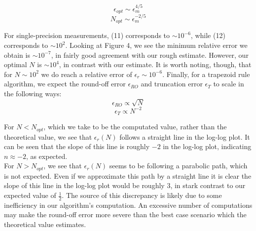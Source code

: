 \documentclass[12pt,letterpaper]{article}
\begin{document}
\begin{equation}
	\epsilon_{opt} \sim \epsilon_{m}^{4/5}
\end{equation}
\begin{equation}
	N_{opt} \sim \epsilon_{m}^{-2/5}
\end{equation}

For single-precision measurements, (11) corresponds to $\sim 10^{-6}$, while (12) corresponds to $\sim 10^2$. Looking at Figure 4, we see the minimum relative error we obtain is $\sim 10^{-7}$, in fairly good agreement with our rough estimate. However, our optimal $N$ is $\sim 10^{4}$, in contrast with our estimate. It is worth noting, though, that for $N\sim 10^{2}$ we do reach a relative error of $\epsilon_{r}\sim 10^{-6}$. Finally, for a trapezoid rule algorithm, we expect the round-off error $\epsilon_{RO}$ and truncation error $\epsilon_{T}$ to scale in the following ways:
\begin{equation}
	\epsilon_{RO} \propto \sqrt{N}
\end{equation}
\begin{equation}
	\epsilon_{T} \propto N^{-2}
\end{equation}

For $N<N_{opt}$, which we take to be the computated value, rather than the theoretical value, we see that $\epsilon_{r}(N)$ follows a straight line in the log-log plot. It can be seen that the slope of this line is roughly $-2$ in the log-log plot, indicating $n\approx -2$, as expected. \\

For $N>N_{opt}$, we see that $\epsilon_{r}(N)$ seems to be following a parabolic path, which is not expected. Even if we approximate this path by a straight line it is clear the slope of this line in the log-log plot would be roughly $3$, in stark contrast to our expected value of $\frac{1}{2}$. The source of this discrepancy is likely due to some inefficiency in our algorithm's computation. An excessive number of computations may make the round-off error more severe than the best case scenario which the theoretical value estimates.
\end{document}
